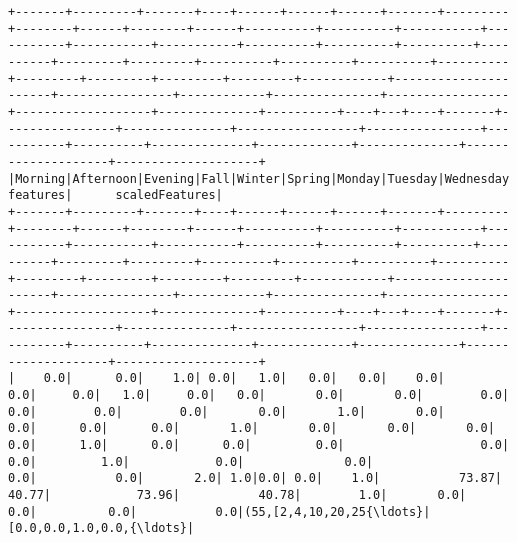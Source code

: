 \documentclass[11pt]{article}
\begin{document}
    \begin{Verbatim}[commandchars=\\\{\}]
+-------+---------+-------+----+------+------+------+-------+---------+--------+------+--------+------+----------+----------+-----------+-----------+-----------+-----------+----------+----------+----------+----------+---------+---------+----------+----------+----------+----------+---------+---------+---------+---------+------------+----------------------+----------------+------------+---------------+-----------------+-------------------+--------------+----------+----+---+----+-------+----------------+---------------+-----------------+----------------+-----------+----------+--------------+-------------+--------------+--------------------+--------------------+
|Morning|Afternoon|Evening|Fall|Winter|Spring|Monday|Tuesday|Wednesday|Thursday|Friday|Saturday|Sunday|dropoff\_cc|dropoff\_GM|dropoff\_ues|dropoff\_Gvs|dropoff\_Uws|dropoff\_Les|dropoff\_Lm|dropoff\_Wq|dropoff\_Nb|dropoff\_ch|Pickup\_cc|Pickup\_GM|Pickup\_ues|Pickup\_Gvs|Pickup\_Uws|Pickup\_Les|Pickup\_Lm|Pickup\_Wq|Pickup\_Nb|Pickup\_Nq|VendorID\_1\_0|store\_and\_fwd\_flag\_1\_0|RateCode\_stdrate|RateCode\_JFK|RateCode\_Newark|RateCode\_Nassau\_W|RateCode\_Negotiated|RateCode\_Group|avg\_temp\_C|Rain|Fog|Snow|Holiday|pickup\_longitude|pickup\_latitude|dropoff\_longitude|dropoff\_latitude|ptype\_CCard|ptype\_cash|ptype\_nocharge|ptype\_dispute|ptype\_voidtrip|            features|      scaledFeatures|
+-------+---------+-------+----+------+------+------+-------+---------+--------+------+--------+------+----------+----------+-----------+-----------+-----------+-----------+----------+----------+----------+----------+---------+---------+----------+----------+----------+----------+---------+---------+---------+---------+------------+----------------------+----------------+------------+---------------+-----------------+-------------------+--------------+----------+----+---+----+-------+----------------+---------------+-----------------+----------------+-----------+----------+--------------+-------------+--------------+--------------------+--------------------+
|    0.0|      0.0|    1.0| 0.0|   1.0|   0.0|   0.0|    0.0|      0.0|     0.0|   1.0|     0.0|   0.0|       0.0|       0.0|        0.0|        0.0|        0.0|        0.0|       0.0|       1.0|       0.0|       0.0|      0.0|      0.0|       1.0|       0.0|       0.0|       0.0|      0.0|      1.0|      0.0|      0.0|         0.0|                   0.0|             0.0|         1.0|            0.0|              0.0|                0.0|           0.0|       2.0| 1.0|0.0| 0.0|    1.0|           73.87|          40.77|            73.96|           40.78|        1.0|       0.0|           0.0|          0.0|           0.0|(55,[2,4,10,20,25{\ldots}|[0.0,0.0,1.0,0.0,{\ldots}|

\end{Verbatim}
\end{document}
